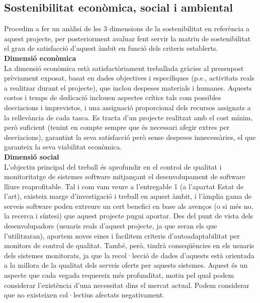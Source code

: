 \subsection{Sostenibilitat econòmica, social i ambiental}

Procedim a fer un anàlisi de les 3 dimensions de la sostenibilitat en referència a aquest projecte, per posteriorment avaluar fent servir la matriu de sostenibilitat el grau de satisfacció d’aquest àmbit en funció dels criteris establerts.\\

\noindent \textbf{\large Dimensió econòmica}\\

\noindent La dimensió econòmica està satisfactòriament treballada gràcies al pressupost prèviament exposat, basat en dades objectives i específiques (p.e., activitats reals a realitzar durant el projecte), que inclou despeses materials i humanes. Aquests costos i temps de dedicació inclouen aspectes crítics tals com possibles desviacions i imprevistos, i una assignació proporcional dels recursos assignats a la rellevància de cada tasca. Es tracta d’un projecte realitzat amb el cost mínim, però suficient (tenint en compte sempre que és necessari afegir extres per desviacions), garantint la seva satisfacció però sense despeses innecessàries, el que garanteix la seva viabilitat econòmica.\\

\noindent \textbf{\large Dimensió social}\\

\noindent L’objectiu principal del treball és aprofundir en el control de qualitat i monitoritatge de sistemes software mitjançant el desenvolupament de software lliure reaprofitable. Tal i com vam veure a l’entregable 1 (a l’apartat Estat de l’art), existeix marge d’investigació i treball en aquest àmbit, i l’àmplia gama de serveis software poden extreure un cert benefici en base als avenços (o si més no, la recerca i síntesi) que aquest projecte pugui aportar. Des del punt de vista dels desenvolupadors (usuaris reals d’aquest projecte, ja que seran els que l’utilitzaran), aportem noves eines i facilitem criteris d’autoadaptabilitat per monitors de control de qualitat. També, però, tindrà conseqüències en els usuaris dels sistemes monitorats, ja que la recol·lecció de dades d’aquests està orientada a la millora de la qualitat dels serveis oferts per aquests sistemes. Aquest és un aspecte que cada vegada requereix més profunditat, motiu pel qual podem considerar l’existència d’una necessitat dins el mercat actual. Podem considerar que no existeixen col·lectius afectats negativament.\\

